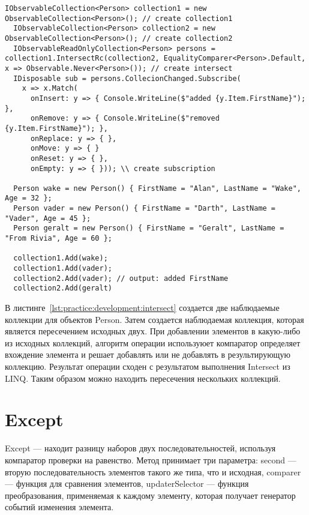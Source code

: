 \begin{lstlisting}[style=csharpinlinestyle, caption={Пример использования Intersect}, label=lst:practice:development:intersect]
  IObservableCollection<Person> collection1 = new ObservableCollection<Person>(); // create collection1
  IObservableCollection<Person> collection2 = new ObservableCollection<Person>(); // create collection2
  IObservableReadOnlyCollection<Person> persons = collection1.IntersectRc(collection2, EqualityComparer<Person>.Default, x => Observable.Never<Person>()); // create intersect
  IDisposable sub = persons.CollecionChanged.Subscribe(
    x => x.Match(
      onInsert: y => { Console.WriteLine($"added {y.Item.FirstName}"); },
      onRemove: y => { Console.WriteLine($"removed {y.Item.FirstName}"); },
      onReplace: y => { },
      onMove: y => { }
      onReset: y => { },
      onEmpty: y => { })); \\ create subscription

  Person wake = new Person() { FirstName = "Alan", LastName = "Wake", Age = 32 };
  Person vader = new Person() { FirstName = "Darth", LastName = "Vader", Age = 45 };
  Person geralt = new Person() { FirstName = "Geralt", LastName = "From Rivia", Age = 60 };

  collection1.Add(wake);
  collection1.Add(vader);
  collection2.Add(vader); // output: added FirstName
  collection2.Add(geralt)
\end{lstlisting}

В листинге~\ref{lst:practice:development:intersect} создается две наблюдаемые коллекции для объектов Person. Затем создается наблюдаемая коллекция, которая является пересечением исходных двух.
При добавлении элементов в какую-либо из исходных коллекций, алгоритм операции используюет компаратор определяет вхождение элемента и решает добавлять или не добавлять в результирующую коллекцию.
Результат операции сходен с результатом выполнения Intersect из LINQ. Таким образом можно находить пересечения нескольких коллекций.

\section{Except}
\label{sub:development:except}

Except --- находит разницу наборов двух последовательностей, используя компаратор проверки на равенство.
Метод принимает три параметра: second --- вторую последовательность элементов такого же типа, что и исходная,
comparer --- функция для сравнения элементов, updaterSelector --- функция преобразования, применяемая к каждому элементу, которая получает генератор событий изменения элемента.

